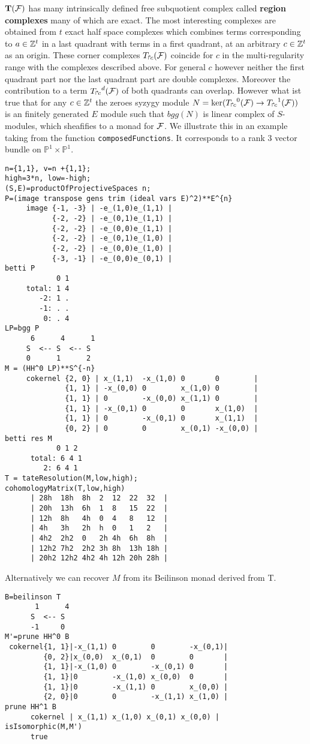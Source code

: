 \documentclass[twoside,12pt, leqno]{amsart}
\def\PP{{\mathbb P}}
\def\cornerT#1{{T_{\Rsh \kern -1pt #1}}}
\def\bT{{\bf T}}
\begin{document}
$\bT(\sF)$  has many intrinsically defined free subquotient complex called {\bf region complexes} many of which are exact. The most interesting complexes are obtained from $t$ exact half space complexes which combines terms corresponding to $a\in {\mathbb Z}^t$ in a last quadrant with terms in a first quadrant, at an arbitrary $c \in {\mathbb Z}^t$ as an origin. These corner complexes $\cornerT c (\sF)$ coincide for $c$ in the multi-regularity range with the complexes described above. For general $c$ however neither the first quadrant part nor the last quadrant part are double complexes. Moreover the contribution to a term ${\cornerT c}^d (\sF)$ of both quadrants can overlap.
However what ist true that for any $c\in {\mathbb Z}^t$ the zeroes syzygy module $N = \ker({\cornerT c}^0 (\sF) \to {\cornerT c}^1 (\sF))$
is an finitely generated $E$ module such that $bgg(N)$ is linear complex of $S$-modules, which sheafifies to a monad for ${\mathcal F}$.
We illustrate this in an example taking from the function {\tt composedFunctions}. It corresponds to a rank $3$ vector bundle on $\PP^1\times \PP^1$. {\small \begin{verbatim}
n={1,1}, v=n +{1,1};
high=3*n, low=-high;
(S,E)=productOfProjectiveSpaces n;
P=(image transpose gens trim (ideal vars E)^2)**E^{n}
     image {-1, -3} | -e_(1,0)e_(1,1) |
           {-2, -2} | -e_(0,1)e_(1,1) |
           {-2, -2} | -e_(0,0)e_(1,1) |
           {-2, -2} | -e_(0,1)e_(1,0) |
           {-2, -2} | -e_(0,0)e_(1,0) |
           {-3, -1} | -e_(0,0)e_(0,1) |
betti P
            0 1
     total: 1 4
        -2: 1 .
        -1: . .
         0: . 4
LP=bgg P 
      6      4      1
     S  <-- S  <-- S                    
     0      1      2
M = (HH^0 LP)**S^{-n}
     cokernel {2, 0} | x_(1,1)  -x_(1,0) 0       0        |
              {1, 1} | -x_(0,0) 0        x_(1,0) 0        |
              {1, 1} | 0        -x_(0,0) x_(1,1) 0        |
              {1, 1} | -x_(0,1) 0        0       x_(1,0)  |
              {1, 1} | 0        -x_(0,1) 0       x_(1,1)  |
              {0, 2} | 0        0        x_(0,1) -x_(0,0) |
betti res M
            0 1 2
      total: 6 4 1
         2: 6 4 1
T = tateResolution(M,low,high); 
cohomologyMatrix(T,low,high)
      | 28h  18h  8h  2  12  22  32  |
      | 20h  13h  6h  1  8   15  22  |
      | 12h  8h   4h  0  4   8   12  |
      | 4h   3h   2h  h  0   1   2   |
      | 4h2  2h2  0   2h 4h  6h  8h  |
      | 12h2 7h2  2h2 3h 8h  13h 18h |
      | 20h2 12h2 4h2 4h 12h 20h 28h |
\end{verbatim}}

\noindent
Alternatively we can recover $M$ from its Beilinson monad derived from T.
{\small \begin{verbatim}
B=beilinson T
       1      4
      S  <-- S              
      -1     0
M'=prune HH^0 B
 cokernel{1, 1}|-x_(1,1) 0        0        -x_(0,1)|
         {0, 2}|x_(0,0)  x_(0,1)  0        0       |
         {1, 1}|-x_(1,0) 0        -x_(0,1) 0       |
         {1, 1}|0        -x_(1,0) x_(0,0)  0       |
         {1, 1}|0        -x_(1,1) 0        x_(0,0) |
         {2, 0}|0        0        -x_(1,1) x_(1,0) |
prune HH^1 B
      cokernel | x_(1,1) x_(1,0) x_(0,1) x_(0,0) |
isIsomorphic(M,M')
      true
\end{verbatim}}
\end{document}
